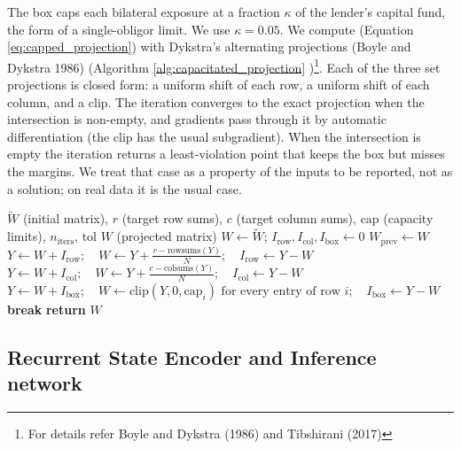 \documentclass[
  a4paper,
]{article}
\begin{document}
The box caps each bilateral exposure at a fraction \(\kappa\) of the
lender's capital fund, the form of a single-obligor limit. We use
\(\kappa = 0.05\). We compute (Equation \ref{eq:capped_projection}) with
Dykstra's alternating projections (Boyle and Dykstra 1986) (Algorithm
\ref{alg:capacitated_projection} )\footnote{For details refer Boyle and
  Dykstra (1986) and Tibshirani (2017)}. Each of the three set
projections is closed form: a uniform shift of each row, a uniform shift
of each column, and a clip. The iteration converges to the exact
projection when the intersection is non-empty, and gradients pass
through it by automatic differentiation (the clip has the usual
subgradient). When the intersection is empty the iteration returns a
least-violation point that keeps the box but misses the margins. We
treat that case as a property of the inputs to be reported, not as a
solution; on real data it is the usual case.

\begin{algorithm}[htbp]
  \caption{Capacitated Projection}
  \label{alg:capacitated_projection}
    \begin{algorithmic}[1]
      \Require $\tilde{W}$ (initial matrix), $r$ (target row sums), $c$ (target column sums), $\text{cap}$ (capacity limits), $n_{\text{iters}}$, $\text{tol}$
      \Ensure $W$ (projected matrix)
      \State $W \leftarrow \tilde{W}$; \quad $I_{\text{row}}, I_{\text{col}}, I_{\text{box}} \leftarrow 0$
          \State $W_{\text{prev}} \leftarrow W$
          \State $Y \leftarrow W + I_{\text{row}}; \quad W \leftarrow Y + \frac{r - \text{rowsums}(Y)}{N}; \quad I_{\text{row}} \leftarrow Y - W$
          \State $Y \leftarrow W + I_{\text{col}}; \quad W \leftarrow Y + \frac{c - \text{colsums}(Y)}{N}; \quad I_{\text{col}} \leftarrow Y - W$
          \State $Y \leftarrow W + I_{\text{box}}; \quad W \leftarrow \text{clip}(Y, 0, \text{cap}_i) \text{ for every entry of row } i; \quad I_{\text{box}} \leftarrow Y - W$
              \State \textbf{break}
          \EndIf
      \EndFor
      \State \textbf{return} $W$
  \end{algorithmic}
\end{algorithm}

\subsection{Recurrent State Encoder and Inference
network}\label{sec-methodology-recurrent-state-encoder-inference-network}
\end{document}
